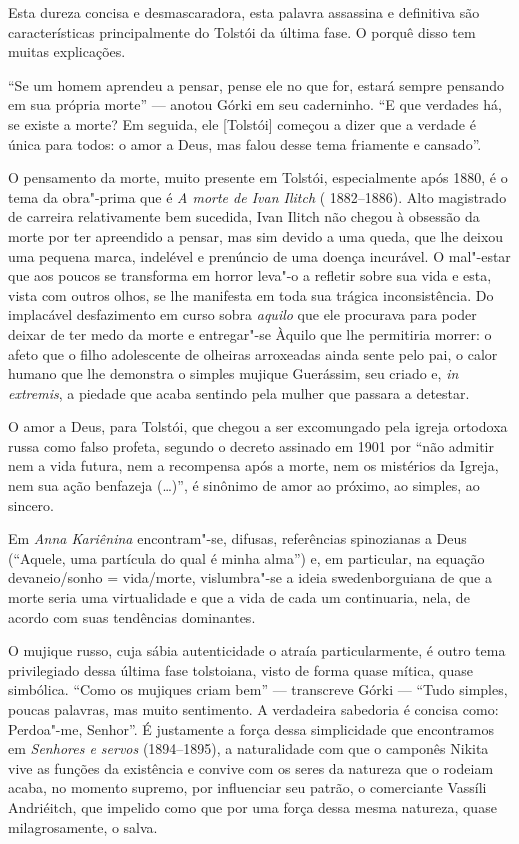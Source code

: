 Esta dureza concisa e desmascaradora, esta palavra
assassina e definitiva são características principalmente do Tolstói
da última fase. O porquê disso tem muitas explicações.

``Se um homem aprendeu a pensar, pense ele no que
for, estará sempre pensando em sua própria morte'' --- anotou Górki em
seu caderninho. ``E que verdades há, se existe a morte? Em seguida,
ele [Tolstói] começou a dizer que a verdade é única para todos: o
amor a Deus, mas falou desse tema friamente e cansado''.

O pensamento da morte, muito presente em Tolstói, especialmente após
1880, é o tema da obra"-prima que é \emph{A morte de Ivan Ilitch} (
1882--1886). Alto magistrado de carreira relativamente bem
sucedida, Ivan Ilitch não chegou à obsessão da morte
por ter apreendido a pensar, mas sim devido a uma queda, que lhe
deixou uma pequena marca, indelével e prenúncio de uma doença
incurável. O mal"-estar que aos poucos se transforma em horror leva"-o a
refletir sobre sua vida e esta, vista com outros olhos, se
lhe manifesta em toda sua trágica inconsistência. Do
implacável desfazimento em curso sobra \emph{aquilo} que ele procurava
para poder deixar de ter medo da morte e entregar"-se Àquilo que lhe
permitiria morrer: o afeto que o filho adolescente de olheiras
arroxeadas ainda sente pelo pai, o calor humano que lhe demonstra o
simples mujique Guerássim, seu criado e, \emph{in extremis}, a
piedade que acaba sentindo pela mulher que passara a detestar.

O amor a Deus, para Tolstói, que chegou a ser excomungado pela
igreja ortodoxa russa como falso profeta, segundo o decreto assinado
em 1901 por ``não admitir nem a vida futura, nem a recompensa após a
morte, nem os mistérios da Igreja, nem sua ação benfazeja (\ldots{})'', é
sinônimo de amor ao próximo, ao simples, ao sincero.

Em \emph{Anna Kariênina} encontram"-se, difusas, referências
spinozianas a Deus (``Aquele, uma partícula do qual é minha
alma'') e, em particular, na equação
devaneio/sonho = vida/morte, vislumbra"-se a ideia swedenborguiana de que
a morte seria uma virtualidade e que a vida de cada um continuaria,
nela, de acordo com suas tendências dominantes.

O mujique russo, cuja sábia autenticidade o atraía particularmente,
é outro tema privilegiado dessa última fase tolstoiana, visto de
forma quase mítica, quase simbólica. ``Como os mujiques criam bem''
--- transcreve Górki --- ``Tudo simples, poucas palavras, mas muito
sentimento. A verdadeira sabedoria é concisa como: Perdoa"-me, Senhor''.
É justamente a força dessa simplicidade que encontramos
em \emph{Senhores e servos} (1894--1895), a naturalidade com que o
camponês Nikita vive as funções da existência e convive com os seres da
natureza que o rodeiam acaba, no momento supremo, por influenciar seu
patrão, o comerciante Vassíli Andriéitch, que impelido como que por uma
força dessa mesma natureza, quase milagrosamente, o salva.

